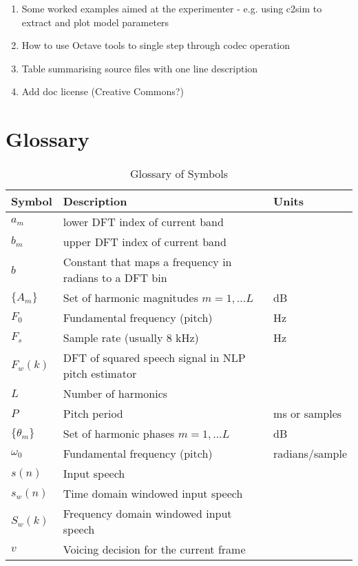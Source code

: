 \documentclass{article}
\begin{document}
\begin{enumerate}
\item Some worked examples aimed at the experimenter - e.g. using c2sim to extract and plot model parameters
\item How to use Octave tools to single step through codec operation
\item Table summarising source files with one line description
\item Add doc license (Creative Commons?)
\end{enumerate}

\section{Glossary}
\label{sect:glossary}

\begin{table}[H]
\label{tab:symbol_glossary}
\centering
\begin{tabular}{l l l }
\hline
Symbol & Description & Units \\
\hline
$a_m$ & lower DFT index of current band \\
$b_m$ & upper DFT index of current band \\
$b$ & Constant that maps a frequency in radians to a DFT bin \\
$\{A_m\}$ & Set of harmonic magnitudes $m=1,...L$ & dB \\
$F_0$ & Fundamental frequency (pitch) & Hz \\
$F_s$ & Sample rate (usually 8 kHz) & Hz \\
$F_w(k)$ & DFT of squared speech signal in NLP pitch estimator \\
$L$ & Number of harmonics \\
$P$ & Pitch period & ms or samples \\
$\{\theta_m\}$ & Set of harmonic phases $m=1,...L$ & dB \\
$\omega_0$ & Fundamental frequency (pitch) & radians/sample \\
$s(n)$ & Input speech \\
$s_w(n)$ & Time domain windowed input speech \\
$S_w(k)$ & Frequency domain windowed input speech \\
$v$ & Voicing decision for the current frame \\
\hline
\end{tabular}
\caption{Glossary of Symbols}
\end{table}



\end{document}

